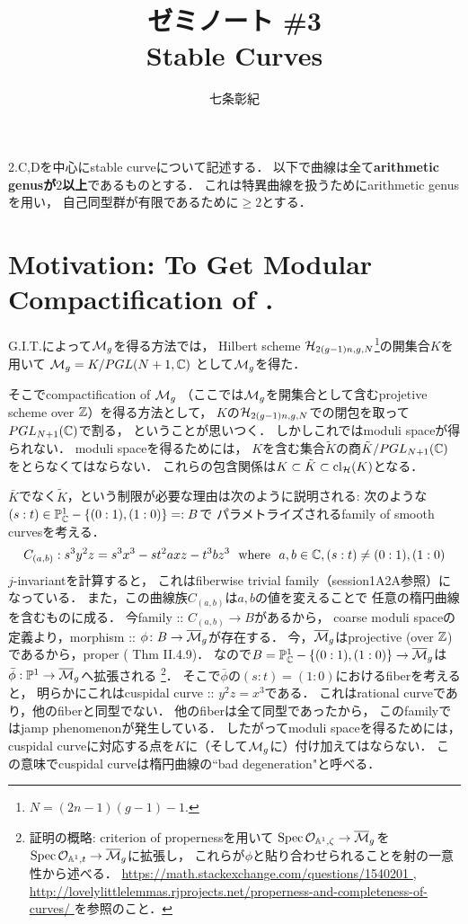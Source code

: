 \documentclass[a4paper]{jsarticle}
\begin{document}
\title{ゼミノート \#3 \\ Stable Curves}
\author{七条彰紀}
\maketitle

\cite{HaMo} 2.C,Dを中心にstable curveについて記述する．
以下で曲線は全て\textbf{arithmetic genusが$2$以上}であるものとする．
これは特異曲線を扱うためにarithmetic genusを用い，
自己同型群が有限であるために$\geq 2$とする．

\section{Motivation: To Get Modular Compactification of .}
    G.I.T.によって$\mathcal{M}_g$を得る方法では，
    Hilbert scheme $\mathcal{H}_{2(g-1)n, g, N}$\footnote{$N=(2n-1)(g-1)-1$.}の開集合$K$を用いて
    $\mathcal{M}_g=K/PGL(N+1, \mathbb{C})$
    として$\mathcal{M}_g$を得た．

    そこでcompactification of $\mathcal{M}_g$
    （ここでは$\mathcal{M}_g$を開集合として含むprojetive scheme over $\mathbb{Z}$）を得る方法として，
    $K$の$\mathcal{H}_{2(g-1)n, g, N}$での閉包を取って$PGL_{N+1}(\mathbb{C})$で割る，
    ということが思いつく．
    しかしこれではmoduli spaceが得られない．
    moduli spaceを得るためには，
    $K$を含む集合$\tilde{K}$の商$\tilde{K}/PGL_{N+1}(\mathbb{C})$をとらなくてはならない．
    これらの包含関係は$K \subset \tilde{K} \subset \operatorname{cl}_{\mathcal{H}}(K)$となる．

    $\bar{K}$でなく$\tilde{K}$，という制限が必要な理由は次のように説明される:
    次のような$(s:t) \in \mathbb{P}_{\mathbb{C}}^1-\{(0:1), (1:0)\}=:B$で
    パラメトライズされるfamily of smooth curvesを考える．
    \[
        C_{(a,b)}: s^3y^2z=s^3 x^3-st^2axz-t^3bz^3
        ~~\text{where}~~
        a,b \in \mathbb{C}, (s:t) \neq (0:1), (1:0)
    \]
    $j$-invariantを計算すると，
    これはfiberwise trivial family（session1A2A参照）になっている．
    また，この曲線族$C_{(a,b)}$は$a,b$の値を変えることで
    任意の楕円曲線を含むものに成る．
    今family :: $C_{(a,b)} \to B$があるから，
    coarse moduli spaceの定義より，morphism :: $\phi \colon B \to \overline{\mathcal{M}}_g$が存在する．
    今，$\overline{\mathcal{M}}_g$はprojective (over $\mathbb{Z}$)であるから，proper (\cite{HarAG} Thm II.4.9)．
    なので$B=\mathbb{P}_{\mathbb{C}}^1-\{(0:1), (1:0)\} \to \overline{\mathcal{M}}_g$は
    $\bar{\phi}: \mathbb{P}^1 \to \overline{\mathcal{M}}_g$へ拡張される
    \footnote
    {
        証明の概略:
        criterion of propernessを用いて
        $\operatorname{Spec} \mathcal{O}_{\mathbb{A}^1, \zeta} \to \overline{\mathcal{M}}_g$を
        $\operatorname{Spec} \mathcal{O}_{\mathbb{A}^1, t} \to \overline{\mathcal{M}}_g$に拡張し，
        これらが$\phi$と貼り合わせられることを射の一意性から述べる．
        \url{ https://math.stackexchange.com/questions/1540201 },
        \url{ http://lovelylittlelemmas.rjprojects.net/properness-and-completeness-of-curves/ }
        を参照のこと．
    }．
    そこで$\bar{\phi}$の$(s:t)=(1:0)$におけるfiberを考えると，
    明らかにこれはcuspidal curve :: $y^2z=x^3$である．
    これはrational curveであり，他のfiberと同型でない．
    他のfiberは全て同型であったから，
    このfamilyではjamp phenomenonが発生している．
    したがってmoduli spaceを得るためには，
    cuspidal curveに対応する点を$K$に（そして$\mathcal{M}_g$に）付け加えてはならない．
    この意味でcuspidal curveは楕円曲線の``bad degeneration"と呼べる．
\end{document}
